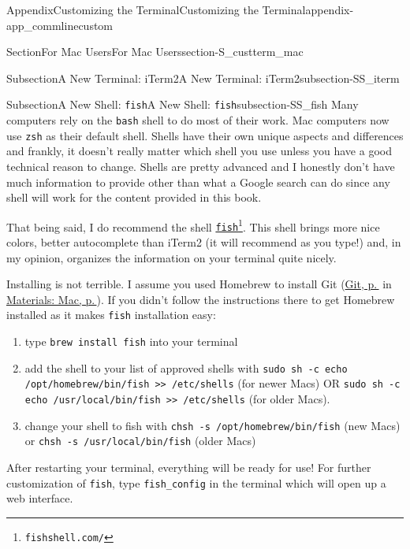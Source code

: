 \documentclass[twoside,10pt,]{book}
\newcommand{\mono}[1]{\texttt{#1}}
\begin{document}
\begin{appendixptx}{Appendix}{Customizing the Terminal}{}{Customizing the Terminal}{}{}{appendix-app_commlinecustom}
\begin{sectionptx}{Section}{For Mac Users}{}{For Mac Users}{}{}{section-S_custterm_mac}
\begin{subsectionptx}{Subsection}{A New Terminal: iTerm2}{}{A New Terminal: iTerm2}{}{}{subsection-SS_iterm}
\end{subsectionptx}
%
%
\typeout{************************************************}
\typeout{Subsection A.1.2 A New Shell: \mono{fish}}
\typeout{************************************************}
%
\begin{subsectionptx}{Subsection}{A New Shell: \mono{fish}}{}{A New Shell: \mono{fish}}{}{}{subsection-SS_fish}
%
%
Many computers rely on the \mono{bash} shell to do most of their work. Mac computers now use \mono{zsh} as their default shell. Shells have their own unique aspects and differences and frankly, it doesn't really matter which shell you use unless you have a good technical reason to change. Shells are pretty advanced and I honestly don't have much information to provide other than what a Google search can do since any shell will work for the content provided in this book.%
\par
That being said, I do recommend the shell \href{https://fishshell.com/}{\mono{fish}}\footnote{\nolinkurl{fishshell.com/}\label{fn-SS_fish-e-b}}. This shell brings more nice colors, better autocomplete than iTerm2 (it will recommend as you type!) and, in my opinion, organizes the information on your terminal quite nicely.%
\par
Installing is not terrible. I assume you used Homebrew to install Git (\hyperlink{paragraphs-install-git-mac}{Git, p.\,\pageref{paragraphs-install-git-mac}} in \hyperref[preface-materials-mac]{Materials: Mac, p.\,\pageref{preface-materials-mac}}). If you didn't follow the instructions there to get Homebrew installed as it makes \mono{fish} installation easy:%
\begin{enumerate}
\item{}type \mono{brew install fish} into your terminal%
\item{}add the shell to your list of approved shells with \mono{sudo sh -c \textquotesingle{}echo /opt/homebrew/bin/fish >> /etc/shells\textquotesingle{}} (for newer Macs) OR \mono{sudo sh -c \textquotesingle{}echo /usr/local/bin/fish >> /etc/shells\textquotesingle{}} (for older Macs).%
\item{}change your shell to fish with \mono{chsh -s /opt/homebrew/bin/fish} (new Macs) or \mono{chsh -s /usr/local/bin/fish} (older Macs)%
\end{enumerate}
After restarting your terminal, everything will be ready for use! For further customization of \mono{fish}, type \mono{fish\_config} in the terminal which will open up a web interface.%
\par

\end{subsectionptx}
\end{sectionptx}
\end{appendixptx}
\end{document}
